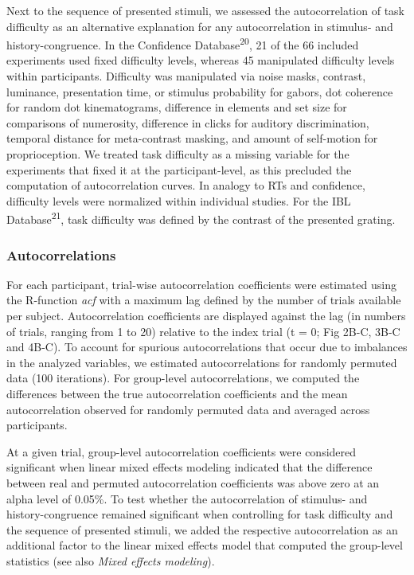 \documentclass[
]{article}
\begin{document}
Next to the sequence of presented stimuli, we assessed the
autocorrelation of task difficulty as an alternative explanation for any
autocorrelation in stimulus- and history-congruence. In the Confidence
Database\textsuperscript{20}, 21 of the 66 included experiments used
fixed difficulty levels, whereas 45 manipulated difficulty levels within
participants. Difficulty was manipulated via noise masks, contrast,
luminance, presentation time, or stimulus probability for gabors, dot
coherence for random dot kinematograms, difference in elements and set
size for comparisons of numerosity, difference in clicks for auditory
discrimination, temporal distance for meta-contrast masking, and amount
of self-motion for proprioception. We treated task difficulty as a
missing variable for the experiments that fixed it at the
participant-level, as this precluded the computation of autocorrelation
curves. In analogy to RTs and confidence, difficulty levels were
normalized within individual studies. For the IBL
Database\textsuperscript{21}, task difficulty was defined by the
contrast of the presented grating.

\hypertarget{autocorrelations}{%
\subsubsection{Autocorrelations}\label{autocorrelations}}

For each participant, trial-wise autocorrelation coefficients were
estimated using the R-function \emph{acf} with a maximum lag defined by
the number of trials available per subject. Autocorrelation coefficients
are displayed against the lag (in numbers of trials, ranging from 1 to
20) relative to the index trial (t = 0; Fig 2B-C, 3B-C and 4B-C). To
account for spurious autocorrelations that occur due to imbalances in
the analyzed variables, we estimated autocorrelations for randomly
permuted data (100 iterations). For group-level autocorrelations, we
computed the differences between the true autocorrelation coefficients
and the mean autocorrelation observed for randomly permuted data and
averaged across participants.

At a given trial, group-level autocorrelation coefficients were
considered significant when linear mixed effects modeling indicated that
the difference between real and permuted autocorrelation coefficients
was above zero at an alpha level of 0.05\%. To test whether the
autocorrelation of stimulus- and history-congruence remained significant
when controlling for task difficulty and the sequence of presented
stimuli, we added the respective autocorrelation as an additional factor
to the linear mixed effects model that computed the group-level
statistics (see also \emph{Mixed effects modeling}).
\end{document}
